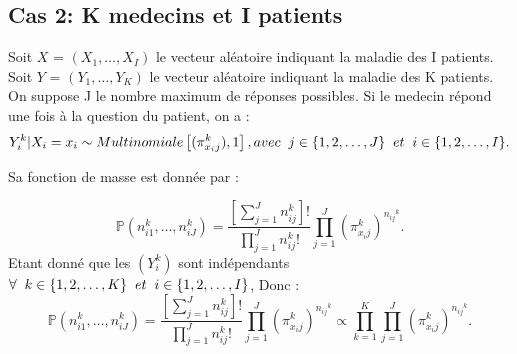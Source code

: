 \documentclass[a4paper,french,10pt]{article}
\begin{document}
	\subsection{Cas 2: K medecins et I patients}
	
	Soit $X$ = $(X_1, \dots, X_I)$ le vecteur aléatoire indiquant la maladie des I patients.\\
	Soit $Y$ = $(Y_1, \dots, Y_K)$ le vecteur aléatoire indiquant la maladie des K patients.\\
	On suppose J le nombre maximum de réponses possibles. Si le medecin répond une fois à la question du patient, on a : 	\[Y_{i}^k | X_i=x_i \sim Multinomiale \left[(\pi_{x_ij}^k), 1\right], avec\hspace{2mm}j \in \{1, 2, \dots,J\}\hspace{2mm} et\hspace{2mm} i \in \{1, 2, \dots,I\} .\]
	
	
	Sa fonction de masse est donnée par :
	
	\[\mathbb{P}\left(n_{i1}^k, \dots, n_{iJ}^k\right) = \frac{\left[\sum_{j=1}^{J} n_{ij}^k\right]!}{\prod_{j=1}^{J} n_{ij}^k !} \prod_{j=1}^{J} \left(\pi_{x_ij}^k\right)^{{n_{ij}}^{k}} .\]
	Etant donné que les $(Y_{i}^k)$ sont indépendants $ \forall\hspace{2mm}k \in \{1, 2, \dots,K\}\hspace{2mm} et\hspace{2mm} i \in \{1, 2, \dots,I\}$, Donc : \[\mathbb{P}\left(n_{i1}^k, \dots, n_{iJ}^k\right) = \frac{\left[\sum_{j=1}^{J} n_{ij}^k\right]!}{\prod_{j=1}^{J} n_{ij}^k !} \prod_{j=1}^{J} \left(\pi_{x_ij}^k\right)^{{n_{ij}}^{k}} \propto \prod_{k=1}^{K} \prod_{j=1}^{J} \left(\pi_{x_ij}^k\right)^{{n_{ij}}^{k}}.\]
	
\end{document}

